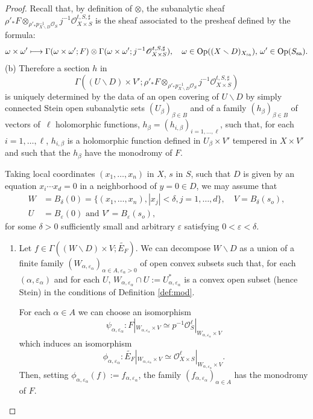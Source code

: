 \documentclass[english]{smfart}
\numberwithin{subsection}{section}
\def\sho{\mathcal{O}}\let\cO\sho
\newcommand{\sa}{\mathrm{sa}}
\newcommand{\XS}{X\times S}
\DeclareMathOperator{\Op}{Op}
\let\tilde\widetilde
\let\epsilon\varepsilon
\let\setminus\smallsetminus
\newcommand{\pOS}{p^{-1}\sho_S}
\numberwithin{equation}{section}
\theoremstyle{plain}
\theoremstyle{definition}
\def\mto{\mathchoice{\longmapsto}{\mapsto}{\mapsto}{\mapsto}}
\begin{document}
\begin{proof}
Recall that, by definition of $\otimes$, the subanalytic sheaf $\rho'_*F\otimes_{\rho'_*p_{X\setminus D}^{-1}\sho_S} j^{-1}\sho^{t, S,\sharp}_{\XS}$ is the sheaf associated to the presheaf defined by the formula:
$$\omega\times \omega'\mto \Gamma(\omega\times \omega'; F)\otimes \Gamma(\omega\times \omega'; j^{-1}\sho_{\XS}^{t,S,\sharp}), \quad \omega\in\Op((X\setminus D)_{X_{\sa}}),\,\omega'\in\Op(S_{\sa}).$$
(b) Therefore a section $h$ in
\[
\Gamma((U\setminus D)\times V'; \rho'_*F\otimes_{\rho'_*p_{X\setminus D}^{-1}\sho_S} j^{-1}\sho^{t, S,\sharp}_{\XS})
\]
is uniquely determined by the data of an open covering of $U\setminus D$ by simply connected Stein open subanalytic sets $(U_{\beta})_{\beta\in B}$ and of a family $(h_{\beta})_{\beta\in B}$ of vectors of~$\ell$ holomorphic functions, $h_{\beta}=({h_{i,\beta}})_{i=1,\dots,\ell}$, such that, for each $i=1,\dots,\ell$, $h_{i,\beta}$ is a holomorphic function defined in $U_{\beta}\times V'$ tempered in $X\times V'$ and such that the $h_{\beta}$ have the monodromy of $F$.

Taking local coordinates $(x_1,\dots, x_n)$ in $X$, $s$ in $S$, such that $D$ is given by an equation $x_i\cdots x_d=0$ in a neighborhood of $y=0\in D$, we may assume that
\begin{align*}
W&=B_{\delta}(0)=\{(x_1,\dots,x_n), |x_j|<\delta, j=1,\dots, d \},\quad V=B_{\delta}(s_o),\\
U&=B_{\epsilon}(0)\text{ and } V'=B_{\epsilon}(s_o),
\end{align*}
for some $\delta>0$ sufficiently small and arbitrary $\epsilon$ satisfying $0<\epsilon<\delta$.

\begin{enumerate}
\item
Let $f\in \Gamma((W\setminus D)\times V; \tilde{E_F})$.
We can decompose $W\setminus D$ as a union of
a finite family $(W_{\alpha,\epsilon_{\alpha}})_{\alpha\in A, \epsilon_{\alpha}>0}$ of open convex subsets such that, for each $(\alpha, \epsilon_{\alpha})$ and for each $U$, $W_{\alpha,\epsilon_{\alpha}}\cap U:=U^*_{\alpha,\epsilon_{\alpha}}$ is a convex open subset (hence Stein) in the conditions of Definition \ref{def:mod}.

For each $\alpha\in A$ we can choose an isomorphism
\[
\psi_{\alpha,\epsilon_{\alpha}}: F|_{W_{\alpha,\epsilon_{\alpha}}\times V}\simeq \pOS ^\ell|_{W_{\alpha,\epsilon_{\alpha}}\times V}
\]
which induces an isomorphism
\[
\phi_{\alpha,\epsilon_{\alpha}}:\tilde{E_F}|_{W_{\alpha,\epsilon_{\alpha}}\times V}\simeq \sho_{\XS}^\ell|_{W_{\alpha,\epsilon_{\alpha}}\times V}.
\]
Then, setting $\phi_{\alpha,\epsilon_{\alpha}}(f):=f_{\alpha,\epsilon_{\alpha}}$, the family $(f_{\alpha, \epsilon_{\alpha}})_{\alpha\in A}$ has the monodromy of $F$.


\end{enumerate}
\end{proof}
\end{document}
